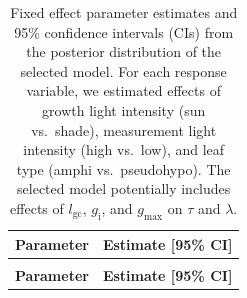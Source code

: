 \documentclass[
  letterpaper,
  DIV=11,
  numbers=noendperiod]{scrartcl}
\newcommand{\gcl}{$l_\mathrm{gc}$}
\newcommand{\gi}{$g_\mathrm{i}$}
\newcommand{\gmax}{$g_\mathrm{max}$}
\begin{document}
\clearpage

\begin{longtable}{>{\raggedright\arraybackslash}p{3.75in}>{\raggedright\arraybackslash}p{2in}}

\caption{\label{tbl-fixed}Fixed effect parameter estimates and 95\%
confidence intervals (CIs) from the posterior distribution of the
selected model. For each response variable, we estimated effects of
growth light intensity (sun vs.~shade), measurement light intensity
(high vs.~low), and leaf type (amphi vs.~pseudohypo). The selected model
potentially includes effects of \gcl, \gi{}, and \gmax{} on \(\tau\) and
\(\lambda\).}

\tabularnewline

\toprule
\textbf{Parameter} & \textbf{Estimate [95\% CI]}\\
\midrule
\endfirsthead
\multicolumn{2}{@{}l}{\textit{(continued)}}\\
\toprule
\textbf{Parameter} & \textbf{Estimate [95\% CI]}\\
\midrule
\endhead


\end{longtable}
\end{document}
